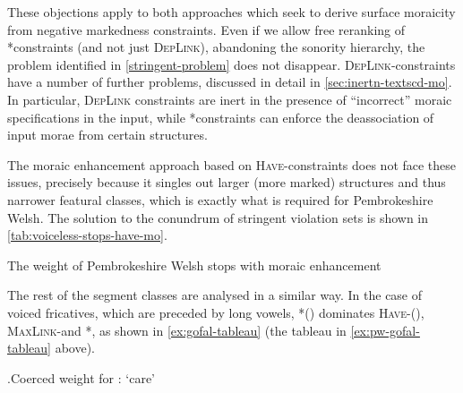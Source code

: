 These objections apply to both approaches which seek to derive surface moraicity from negative markedness constraints. Even if we allow free reranking of *\mo constraints (and not just \textsc{DepLink}), abandoning the sonority hierarchy, the problem identified in \ref{stringent-problem} does not disappear. \textsc{DepLink}-\mo constraints have a number of further problems, discussed in detail in \cref{sec:inertn-textscd-mo}. In particular, \textsc{DepLink} constraints are inert in the presence of \enquote{incorrect} moraic specifications in the input, while *\mo constraints can enforce the deassociation of input morae from certain structures.

The moraic enhancement approach based on \textsc{Have}-\mo constraints does not face these issues, precisely because it singles out larger (more marked) structures and thus narrower featural classes, which is exactly what is required for Pembrokeshire Welsh. The solution to the conundrum of stringent violation sets is shown in \cref{tab:voiceless-stops-have-mo}.

\begin{table}
\centering
  \begin{OTmultitableau}{7}
\OTmcandrow{[e\smo[ɡ\smo]in]}{,,,*!,,,*}
\OTmcandrow{[e\smo[ɡ\smo]in]}{,,,*!,,,*}
\OTmcandrow[][\OThand]{[so\smo[p\smo]as]}{,,*,*,,,*}
\OTmcandrow[][\OThand]{[so\smo[p\smo]as]}{,*,*,*,,,*}
\end{OTmultitableau}
  \caption{The weight of Pembrokeshire Welsh stops with moraic enhancement}
  \label{tab:voiceless-stops-have-mo}
\end{table}

The rest of the segment classes are analysed in a similar way. In the case of voiced fricatives, which are preceded by long vowels, *\mo() dominates \textsc{Have}-\mo(), \textsc{MaxLink}- and *\mo[V], as shown in \ref{ex:gofal-tableau} (\cf the tableau in \ref{ex:pw-gofal-tableau} above).

\ex.\label{ex:gofal-tableau}Coerced weight for : \ipa{[ˈɡoːval]} `care'\\

